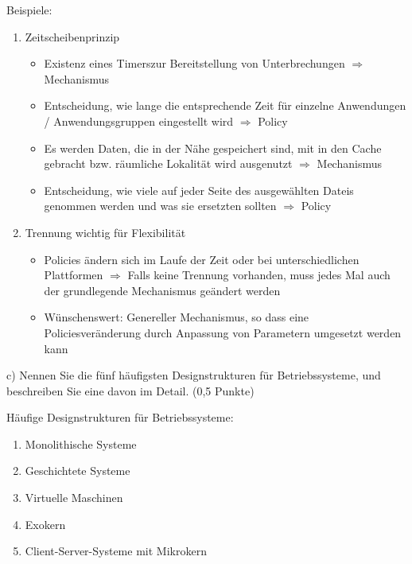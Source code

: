 \documentclass[a4paper,12pt]{article}
\begin{document}
\vspace{\baselineskip}

\large Beispiele:
\normalsize
\begin{enumerate}
	\item Zeitscheibenprinzip
	\begin {itemize}
		\item Existenz eines Timerszur Bereitstellung von Unterbrechungen $\Rightarrow$ Mechanismus
		\item Entscheidung, wie lange die entsprechende Zeit für einzelne Anwendungen / Anwendungsgruppen eingestellt wird $\Rightarrow$ Policy

		\item Es werden Daten, die in der Nähe gespeichert sind, mit in den Cache gebracht bzw. räumliche Lokalität wird ausgenutzt $\Rightarrow$ Mechanismus
		\item Entscheidung, wie viele auf jeder Seite des ausgewählten Dateis genommen werden und was sie ersetzten sollten $\Rightarrow$ Policy
	\end{itemize}
\vspace{\baselineskip}
\vspace{\baselineskip}
	\item Trennung wichtig für Flexibilität
	\begin {itemize}
		\item Policies ändern sich im Laufe der Zeit oder bei unterschiedlichen Plattformen $\Rightarrow$  Falls keine Trennung vorhanden, muss jedes Mal auch der grundlegende Mechanismus geändert werden
		\item Wünschenswert: Genereller Mechanismus, so dass eine Policiesveränderung durch Anpassung von Parametern umgesetzt werden kann
	\end{itemize}
\end{enumerate}

\vspace{\baselineskip}
c) Nennen Sie die fünf häufigsten Designstrukturen für Betriebssysteme, und beschreiben Sie eine davon
im Detail. (0,5 Punkte)
\vspace{\baselineskip}

\large Häufige Designstrukturen für Betriebssysteme:
\normalsize
\begin{enumerate}
	\item Monolithische Systeme
	\item Geschichtete Systeme
	\item Virtuelle Maschinen
	\item Exokern
	\item Client-Server-Systeme mit Mikrokern
\end{enumerate}
\end{document}
